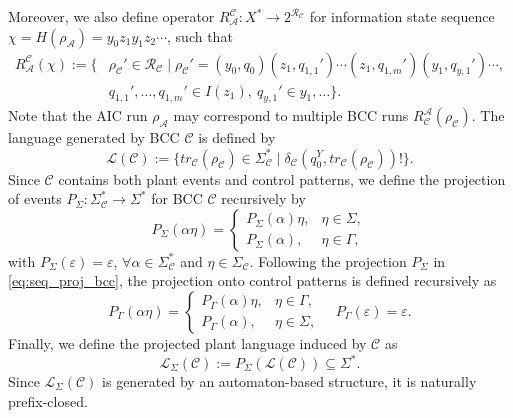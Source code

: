 \documentclass[journal,twoside,web]{ieeecolor}
\begin{document}
%
Moreover, we also define operator $R_{\mathcal{A}}^\mathcal{C} : X^* \rightarrow 2^{\mathcal{R}_{\mathcal{C}}}$  for information state sequence $\chi = H(\rho_\mathcal{A})= y_0 z_1 y_1 z_2 \cdots$, such that
$$
\begin{aligned}
    R_{\mathcal{A}}^\mathcal{C}(\chi) := \{ &\rho_{\mathcal{C}}' \in \mathcal{R}_\mathcal{C} \mid 
        \rho_{\mathcal{C}}' = (y_0, q_0) (z_1, q_{1,1}') \cdots (z_1, q_{1,m}') (y_1, q_{y,1}') \cdots, \\
        & q_{1,1}',\ldots,q_{1,m}' \in I(z_1), \ q_{y,1}' \in y_1, \ldots \}.
\end{aligned}
$$
Note that the AIC run $\rho_{\mathcal{A}}$ may correspond to multiple BCC runs $R_{\mathcal{C}}^\mathcal{A}(\rho_{\mathcal{C}})$.
%
The language generated by BCC $\mathcal{C}$ is defined by
\begin{equation}
    \mathcal{L}(\mathcal{C}) := \{ tr_{\mathcal{C}}(\rho_{\mathcal{C}}) \in \Sigma_{\mathcal{C}}^* \mid \delta_{\mathcal{C}}(q^Y_0, tr_{\mathcal{C}}(\rho_{\mathcal{C}}))! \}.
    \label{eq:lang_bcc}
\end{equation}
Since $\mathcal{C}$ contains both plant events and control patterns, we define the projection of events
$
    P_\Sigma: \Sigma_{\mathcal{C}}^* \to \Sigma^*
$
for BCC $\mathcal{C}$ recursively by
\begin{equation}\label{eq:seq_proj_bcc}
P_\Sigma(\alpha \eta)
=
\begin{cases}
    P_\Sigma(\alpha) \eta, & \eta \in \Sigma,\\
    P_\Sigma(\alpha),      & \eta \in \Gamma,
\end{cases}
\end{equation}
with $P_\Sigma(\varepsilon)=\varepsilon$,
$\forall \alpha \in \Sigma_{\mathcal{C}}^*$ and $\eta \in \Sigma_{\mathcal{C}}$.
Following the projection $P_{\Sigma}$ in \eqref{eq:seq_proj_bcc}, the projection onto control patterns is defined recursively as
\begin{equation}\label{eq:proj_bcc_ctrl}
P_\Gamma(\alpha \eta) =
\begin{cases}
P_\Gamma(\alpha) \eta, & \eta \in \Gamma,\\
P_\Gamma(\alpha), & \eta \in \Sigma,
\end{cases}
\quad
P_\Gamma(\varepsilon)=\varepsilon.
\end{equation}
%
Finally, we define the projected plant language induced by $\mathcal{C}$ as
\begin{equation}
    \mathcal{L}_{\Sigma}(\mathcal{C})
    :=
    P_\Sigma(\mathcal{L}(\mathcal{C}))
    \subseteq \Sigma^* .
    \label{eq:proj_lang_bcc}
\end{equation}
Since $\mathcal{L}_{\Sigma}(\mathcal{C})$ is generated by an automaton-based structure, it is naturally prefix-closed.
\end{document}
